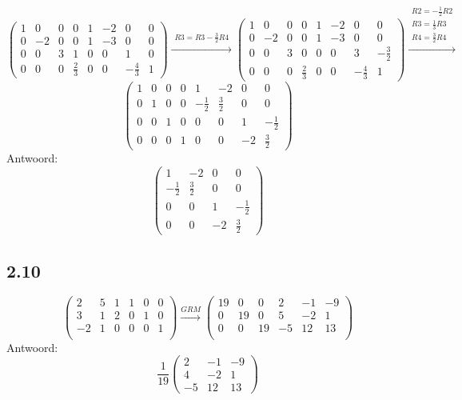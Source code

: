 \documentclass[11pt]{article}
\begin{document}
\[
\left(
\begin{array}{cccc|cccc}
1 & 0 & 0 & 0 & 1 & -2 & 0 & 0\\
0 & -2 & 0 & 0 & 1 & -3 & 0 & 0\\
0 & 0 & 3 & 1 & 0 & 0 & 1 & 0\\
0 & 0 & 0 & \frac{2}{3} & 0 & 0 & -\frac{4}{3} & 1
\end{array}
\right)
\overset{\begin{matrix}
R3=R3-\frac{3}{2}R4
\end{matrix}}{\rightarrow}
\left(
\begin{array}{cccc|cccc}
1 & 0 & 0 & 0 & 1 & -2 & 0 & 0\\
0 & -2 & 0 & 0 & 1 & -3 & 0 & 0\\
0 & 0 & 3 & 0 & 0 & 0 & 3 & -\frac{3}{2}\\
0 & 0 & 0 & \frac{2}{3} & 0 & 0 & -\frac{4}{3} & 1
\end{array}
\right)
\overset{\begin{matrix}
R2 = -\frac{1}{2}R2\\
R3 = \frac{1}{3}R3\\
R4 = \frac{3}{2}R4
\end{matrix}}{\rightarrow}
\]
\[
\left(
\begin{array}{cccc|cccc}
1 & 0 & 0 & 0 & 1 & -2 & 0 & 0\\
0 & 1 & 0 & 0 & -\frac{1}{2} & \frac{3}{2} & 0 & 0\\
0 & 0 & 1 & 0 & 0 & 0 & 1 & -\frac{1}{2}\\
0 & 0 & 0 & 1 & 0 & 0 & -2 & \frac{3}{2}
\end{array}
\right)
\]
Antwoord:\\
\[
\begin{pmatrix}
1 & -2 & 0 & 0\\
-\frac{1}{2} & \frac{3}{2} & 0 & 0\\
0 & 0 & 1 & -\frac{1}{2}\\
0 & 0 & -2 & \frac{3}{2}
\end{pmatrix}
\]

\subsection*{2.10}
\[
\left(
\begin{array}{ccc|ccc}
2 & 5 & 1 & 1 & 0 & 0\\
3 & 1 & 2 & 0 & 1 & 0\\
-2 & 1 & 0 & 0 & 0 & 1\\
\end{array}
\right)
\overset{GRM}{\rightarrow}
\left(
\begin{array}{ccc|ccc}
19 & 0 & 0 & 2 & -1 & -9\\
0 & 19 & 0 & 5 & -2 & 1\\
0 & 0 & 19 & -5 & 12 & 13\\
\end{array}
\right)
\]
Antwoord:\\
\[
\frac{1}{19}
\begin{pmatrix}
2 & -1 & -9\\
4 & -2 & 1\\
-5 & 12 & 13
\end{pmatrix}
\]
\end{document}
